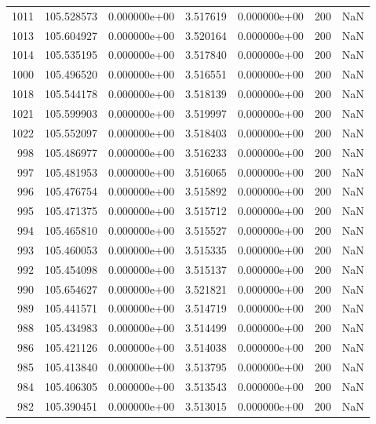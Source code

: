 \begin{tabular}{rrrrrrr}
1011 & 105.528573 &  0.000000e+00 &  3.517619 &  0.000000e+00 &         200 & NaN \\
1013 & 105.604927 &  0.000000e+00 &  3.520164 &  0.000000e+00 &         200 & NaN \\
1014 & 105.535195 &  0.000000e+00 &  3.517840 &  0.000000e+00 &         200 & NaN \\
1000 & 105.496520 &  0.000000e+00 &  3.516551 &  0.000000e+00 &         200 & NaN \\
1018 & 105.544178 &  0.000000e+00 &  3.518139 &  0.000000e+00 &         200 & NaN \\
1021 & 105.599903 &  0.000000e+00 &  3.519997 &  0.000000e+00 &         200 & NaN \\
1022 & 105.552097 &  0.000000e+00 &  3.518403 &  0.000000e+00 &         200 & NaN \\
 998 & 105.486977 &  0.000000e+00 &  3.516233 &  0.000000e+00 &         200 & NaN \\
 997 & 105.481953 &  0.000000e+00 &  3.516065 &  0.000000e+00 &         200 & NaN \\
 996 & 105.476754 &  0.000000e+00 &  3.515892 &  0.000000e+00 &         200 & NaN \\
 995 & 105.471375 &  0.000000e+00 &  3.515712 &  0.000000e+00 &         200 & NaN \\
 994 & 105.465810 &  0.000000e+00 &  3.515527 &  0.000000e+00 &         200 & NaN \\
 993 & 105.460053 &  0.000000e+00 &  3.515335 &  0.000000e+00 &         200 & NaN \\
 992 & 105.454098 &  0.000000e+00 &  3.515137 &  0.000000e+00 &         200 & NaN \\
 990 & 105.654627 &  0.000000e+00 &  3.521821 &  0.000000e+00 &         200 & NaN \\
 989 & 105.441571 &  0.000000e+00 &  3.514719 &  0.000000e+00 &         200 & NaN \\
 988 & 105.434983 &  0.000000e+00 &  3.514499 &  0.000000e+00 &         200 & NaN \\
 986 & 105.421126 &  0.000000e+00 &  3.514038 &  0.000000e+00 &         200 & NaN \\
 985 & 105.413840 &  0.000000e+00 &  3.513795 &  0.000000e+00 &         200 & NaN \\
 984 & 105.406305 &  0.000000e+00 &  3.513543 &  0.000000e+00 &         200 & NaN \\
 982 & 105.390451 &  0.000000e+00 &  3.513015 &  0.000000e+00 &         200 & NaN \\

\end{tabular}
